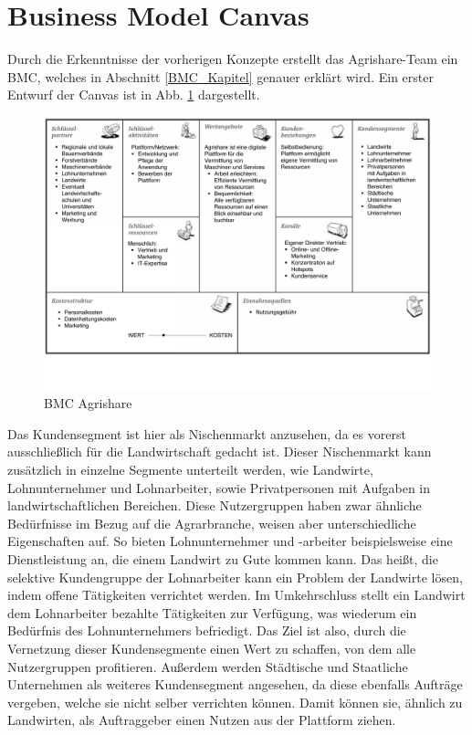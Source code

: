 \section{Business Model Canvas}
Durch die Erkenntnisse der vorherigen Konzepte erstellt das Agrishare-Team ein \ac{BMC}, welches in Abschnitt \ref{BMC_Kapitel} genauer erklärt wird. Ein erster Entwurf der Canvas ist in Abb. \ref{BMC_Agrishare} dargestellt.
\begin{figure}[h!]
		\includegraphics[angle=90,origin=c,width=\textwidth]{99_PDF_INCLUDE/BMC_draft.pdf}
		\caption{\ac{BMC} Agrishare}
		\label{BMC_Agrishare}
\end{figure}

Das Kundensegment ist hier als Nischenmarkt anzusehen, da es vorerst ausschließlich für die Landwirtschaft gedacht ist. Dieser Nischenmarkt kann zusätzlich in einzelne Segmente unterteilt werden, wie Landwirte, Lohnunternehmer und Lohnarbeiter, sowie Privatpersonen mit Aufgaben in landwirtschaftlichen Bereichen. Diese Nutzergruppen haben zwar ähnliche Bedürfnisse im Bezug auf die Agrarbranche, weisen aber unterschiedliche Eigenschaften auf. So bieten Lohnunternehmer und -arbeiter beispielsweise eine Dienstleistung an, die einem Landwirt zu Gute kommen kann. Das heißt, die selektive Kundengruppe der Lohnarbeiter kann ein Problem der Landwirte lösen, indem offene Tätigkeiten verrichtet werden. Im Umkehrschluss stellt ein Landwirt dem Lohnarbeiter bezahlte Tätigkeiten zur Verfügung, was wiederum ein Bedürfnis des Lohnunternehmers befriedigt. Das Ziel ist also, durch die Vernetzung dieser Kundensegmente einen Wert zu schaffen, von dem alle Nutzergruppen profitieren. Außerdem werden Städtische und Staatliche Unternehmen als weiteres Kundensegment angesehen, da diese ebenfalls Aufträge vergeben, welche sie nicht selber verrichten können. Damit können sie, ähnlich zu Landwirten, als Auftraggeber einen Nutzen aus der Plattform ziehen.

